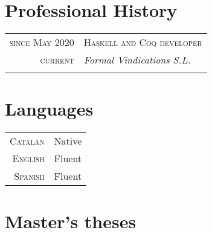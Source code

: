 \documentclass[a4paper,11pt]{article}
\begin{document}
\section{Professional History}
\vspace{0.2cm}
\begin{tabular}{r|p{11cm}}
  \textsc{since May 2020} & \textsc{Haskell and Coq developer} \\
  \textsc{current} & \emph{Formal Vindications S.L.} \\
  \multicolumn{2}{c}{} \\

\end{tabular}

\section{Languages}

\begin{tabular}{rl}
  \textsc{Catalan} & Native \\
  \textsc{English} & Fluent \\
  \textsc{Spanish} & Fluent \\
\end{tabular}


\newpage
\section{Master's theses}
\end{document}
